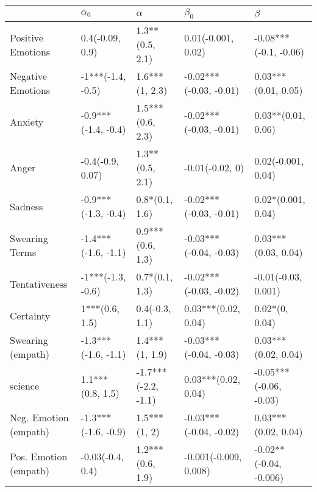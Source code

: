 \begin{tabular}{lllll}
\toprule
{} &           $\alpha_0$ &             $\alpha$ &               $\beta_0$ &                 $\beta$ \\
\midrule
Positive Emotions     &      0.4(-0.09, 0.9) &      1.3**(0.5, 2.1) &      0.01(-0.001, 0.02) &   -0.08***(-0.1, -0.06) \\
Negative Emotions     &    -1***(-1.4, -0.5) &       1.6***(1, 2.3) &  -0.02***(-0.03, -0.01) &     0.03***(0.01, 0.05) \\
Anxiety               &  -0.9***(-1.4, -0.4) &     1.5***(0.6, 2.3) &  -0.02***(-0.03, -0.01) &      0.03**(0.01, 0.06) \\
Anger                 &     -0.4(-0.9, 0.07) &      1.3**(0.5, 2.1) &         -0.01(-0.02, 0) &      0.02(-0.001, 0.04) \\
Sadness               &  -0.9***(-1.3, -0.4) &       0.8*(0.1, 1.6) &  -0.02***(-0.03, -0.01) &      0.02*(0.001, 0.04) \\
Swearing Terms        &  -1.4***(-1.6, -1.1) &     0.9***(0.6, 1.3) &  -0.03***(-0.04, -0.03) &     0.03***(0.03, 0.04) \\
Tentativeness         &    -1***(-1.3, -0.6) &       0.7*(0.1, 1.3) &  -0.02***(-0.03, -0.02) &     -0.01(-0.03, 0.001) \\
Certainty             &       1***(0.6, 1.5) &       0.4(-0.3, 1.1) &     0.03***(0.02, 0.04) &          0.02*(0, 0.04) \\
Swearing (empath)     &  -1.3***(-1.6, -1.1) &       1.4***(1, 1.9) &  -0.03***(-0.04, -0.03) &     0.03***(0.02, 0.04) \\
science               &     1.1***(0.8, 1.5) &  -1.7***(-2.2, -1.1) &     0.03***(0.02, 0.04) &  -0.05***(-0.06, -0.03) \\
Neg. Emotion (empath) &  -1.3***(-1.6, -0.9) &         1.5***(1, 2) &  -0.03***(-0.04, -0.02) &     0.03***(0.02, 0.04) \\
Pos. Emotion (empath) &     -0.03(-0.4, 0.4) &     1.2***(0.6, 1.9) &   -0.001(-0.009, 0.008) &  -0.02**(-0.04, -0.006) \\
\bottomrule
\end{tabular}
